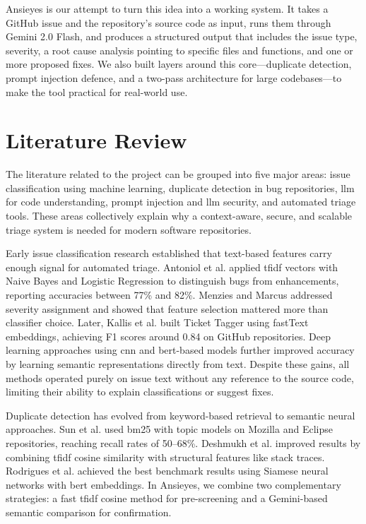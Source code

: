 Ansieyes is our attempt to turn this idea into a working system. It takes a GitHub issue and the repository's source code as input, runs them through Gemini 2.0 Flash, and produces a structured output that includes the issue type, severity, a root cause analysis pointing to specific files and functions, and one or more proposed fixes. We also built layers around this core---duplicate detection, prompt injection defence, and a two-pass architecture for large codebases---to make the tool practical for real-world use.

\section{Literature Review}

The literature related to the project can be grouped into five major areas: issue classification using machine learning, duplicate detection in bug repositories, \gls{llm} for code understanding, prompt injection and \gls{llm} security, and automated triage tools. These areas collectively explain why a context-aware, secure, and scalable triage system is needed for modern software repositories.

Early issue classification research established that text-based features carry enough signal for automated triage. Antoniol et al. \cite{Antoniol2008} applied \gls{tfidf} vectors with Naive Bayes and Logistic Regression to distinguish bugs from enhancements, reporting accuracies between 77\% and 82\%. Menzies and Marcus \cite{Menzies2008} addressed severity assignment and showed that feature selection mattered more than classifier choice. Later, Kallis et al. \cite{Kallis2019} built Ticket Tagger using fastText embeddings, achieving F1 scores around 0.84 on GitHub repositories. Deep learning approaches using \gls{cnn} \cite{Lee2017} and \gls{bert}-based models further improved accuracy by learning semantic representations directly from text. Despite these gains, all methods operated purely on issue text without any reference to the source code, limiting their ability to explain classifications or suggest fixes.

Duplicate detection has evolved from keyword-based retrieval to semantic neural approaches. Sun et al. \cite{Sun2011} used \gls{bm25} with topic models on Mozilla and Eclipse repositories, reaching recall rates of 50--68\%. Deshmukh et al. \cite{Deshmukh2017} improved results by combining \gls{tfidf} cosine similarity with structural features like stack traces. Rodrigues et al. \cite{Rodrigues2020} achieved the best benchmark results using Siamese neural networks with \gls{bert} embeddings. In Ansieyes, we combine two complementary strategies: a fast \gls{tfidf} cosine method for pre-screening and a Gemini-based semantic comparison for confirmation.

